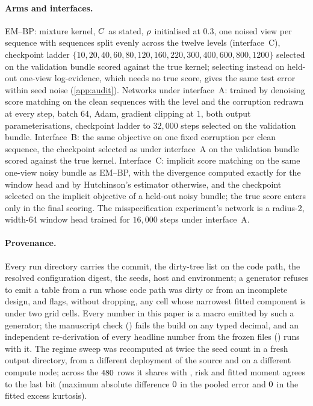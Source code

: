 \paragraph{Arms and interfaces.}
EM--BP: mixture kernel, $C$ as stated, $\rho$ initialised at $0.3$, one
noised view per sequence with sequences split evenly across the twelve levels
(interface~C), checkpoint ladder $\{10,20,40,60,80,120,160,220,300,400,600,800,1200\}$
selected on the validation bundle scored against the true kernel; selecting instead on
held-out one-view log-evidence, which needs no true score, gives the same test error
within seed noise (\cref{app:audit}). Networks under interface~A: trained by denoising
score matching on the clean sequences with the level and the corruption redrawn at every
step, batch $64$, Adam, gradient clipping at $1$, both output parameterisations,
checkpoint ladder to $32{,}000$ steps selected on the validation bundle. Interface~B: the
same objective on one fixed corruption per clean sequence, the checkpoint selected as
under interface~A on the validation bundle scored against the true kernel. Interface~C: implicit score
matching on the same one-view noisy bundle as EM--BP, with the divergence computed
exactly for the window head and by Hutchinson's estimator otherwise, and the checkpoint
selected on the implicit objective of a held-out noisy bundle; the true score enters
only in the final scoring. The misspecification experiment's network is a radius-2,
width-64 window head trained for $16{,}000$ steps under interface~A.

\paragraph{Provenance.}
Every run directory carries the commit, the dirty-tree list on the code path, the
resolved configuration digest, the seeds, host and environment; a generator refuses to
emit a table from a run whose code path was dirty or from an incomplete design, and
flags, without dropping, any cell whose narrowest fitted component is under two grid
cells. Every number in this paper is a macro emitted by such a generator; the manuscript
check () fails the build on any typed decimal, and
an independent re-derivation of every headline number from the frozen files
() runs with it. The regime sweep was recomputed at
twice the seed count in a fresh output directory, from a different deployment of the
source and on a different compute node; across the $480$ rows it shares with
\regReproSource{}, \regReproExact{} risk and \regReproExact{} fitted moment agrees to
the last bit (maximum absolute difference $0$ in the pooled error and
$0$ in the fitted excess kurtosis).
